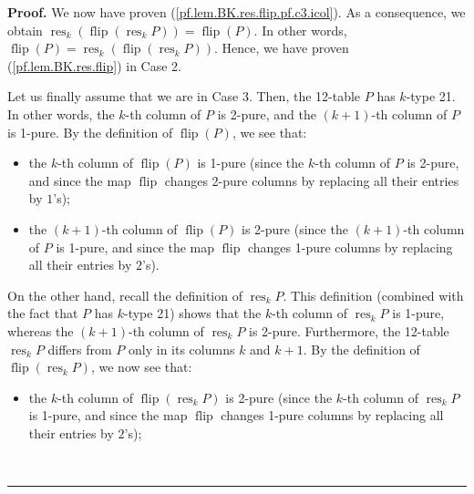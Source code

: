 \documentclass[numbers=enddot,12pt,final,onecolumn,notitlepage]{scrartcl}%
\theoremstyle{definition}
\newenvironment{proof}[1][Proof]{\noindent\textbf{#1.} }{\ \rule{0.5em}{0.5em}}
\newenvironment{verlong}{}{}
\begin{document}
\begin{verlong}
\begin{proof}
We now have proven (\ref{pf.lem.BK.res.flip.pf.c3.icol}). As a consequence, we
obtain $\operatorname*{res}\nolimits_{k}\left(  \operatorname*{flip}\left(
\operatorname*{res}\nolimits_{k}P\right)  \right)  =\operatorname*{flip}%
\left(  P\right)  $. In other words, $\operatorname*{flip}\left(  P\right)
=\operatorname*{res}\nolimits_{k}\left(  \operatorname*{flip}\left(
\operatorname*{res}\nolimits_{k}P\right)  \right)  $. Hence, we have proven
(\ref{pf.lem.BK.res.flip}) in Case 2.

Let us finally assume that we are in Case 3. Then, the 12-table $P$ has
$k$-type 21. In other words, the $k$-th column of $P$ is 2-pure, and the
$\left(  k+1\right)  $-th column of $P$ is 1-pure. By the definition of
$\operatorname*{flip}\left(  P\right)  $, we see that:

\begin{itemize}
\item the $k$-th column of $\operatorname*{flip}\left(  P\right)  $ is 1-pure
(since the $k$-th column of $P$ is 2-pure, and since the map
$\operatorname*{flip}$ changes 2-pure columns by replacing all their entries
by $1$'s);

\item the $\left(  k+1\right)  $-th column of $\operatorname*{flip}\left(
P\right)  $ is 2-pure (since the $\left(  k+1\right)  $-th column of $P$ is
1-pure, and since the map $\operatorname*{flip}$ changes 1-pure columns by
replacing all their entries by $2$'s).
\end{itemize}

On the other hand, recall the definition of $\operatorname*{res}%
\nolimits_{k}P$. This definition (combined with the fact that $P$ has $k$-type
21) shows that the $k$-th column of $\operatorname*{res}_{k}P$ is 1-pure,
whereas the $\left(  k+1\right)  $-th column of $\operatorname*{res}%
\nolimits_{k}P$ is 2-pure. Furthermore, the 12-table $\operatorname*{res}%
\nolimits_{k}P$ differs from $P$ only in its columns $k$ and $k+1$. By the
definition of $\operatorname*{flip}\left(  \operatorname*{res}\nolimits_{k}%
P\right)  $, we now see that:

\begin{itemize}
\item the $k$-th column of $\operatorname*{flip}\left(  \operatorname*{res}%
\nolimits_{k}P\right)  $ is 2-pure (since the $k$-th column of
$\operatorname*{res}\nolimits_{k}P$ is 1-pure, and since the map
$\operatorname*{flip}$ changes 1-pure columns by replacing all their entries
by $2$'s);


\end{itemize}
\end{proof}
\end{verlong}
\end{document}
